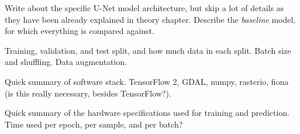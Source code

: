 
Write about the specific U-Net model architecture, but skip a lot of details as they have been already explained in theory chapter.
Describe the \textit{baseline} model, for which everything is compared against.


Training, validation, and test split, and how much data in each split.
Batch size and shuffling.
Data augmentation.


Quick summary of software stack.
TensorFlow 2, GDAL, numpy, rasterio, fiona (is this really necessary, besides TensorFlow?).


Quick summary of the hardware specifications used for training and prediction.
Time used per epoch, per sample, and per batch?
